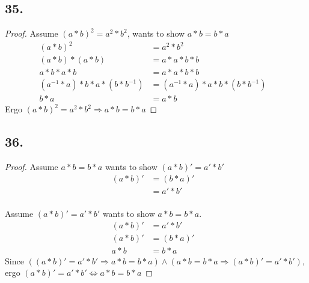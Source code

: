 \documentclass{article}
\begin{document}
\subsection*{35.}
\begin{proof}
	Assume $(a*b)^2 = a^2 * b^2$, wants to show $a*b = b*a$
	\begin{align*}
		(a*b)^2 &= a^2 * b^2&\\
		(a*b)*(a*b) &= a*a*b*b&\\
		a*b*a*b&=a*a*b*b&\\
		(a^{-1}*a)*b*a*(b*b^{-1})&=(a^{-1}*a)*a*b*(b*b^{-1})&\\
		b*a &= a*b &
	\end{align*}
	Ergo $(a*b)^2 = a^2 * b^2 \Rightarrow a*b = b*a$
\end{proof}

\subsection*{36.}
\begin{proof}
	Assume $a*b = b*a$ wants to show $(a*b)'=a' * b'$
	\begin{align*}
		(a*b)' &= (b*a)'&\\
					 &= a'*b'&\\
	\end{align*}

	Assume $(a*b)'=a' * b'$ wants to show $a*b = b*a$.
	\begin{align*}
		(a*b)' &= a'*b'&\\
		(a*b)' &= (b*a)'&\\
		a*b &= b*a&
	\end{align*}
	Since $((a*b)'=a' * b'\Rightarrow a*b = b*a) \wedge (a*b = b*a
	\Rightarrow (a*b)'=a' * b')$, ergo $(a*b)'=a' * b'\Leftrightarrow a*b = b*a$
\end{proof}
\end{document}
